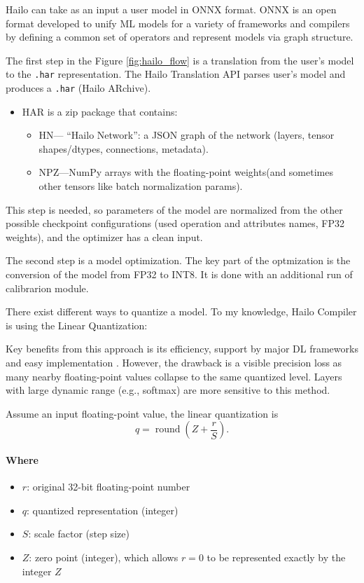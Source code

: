 \documentclass[12pt,a4paper]{report}
\begin{document}
    Hailo can take as an input a user model in ONNX format. ONNX is an open format developed to
    unify ML models for a variety of frameworks and compilers by defining a common set of operators and
    represent models via graph structure.

    The first step in the Figure \ref{fig:hailo_flow} is a translation from the user's
    model to the \texttt{.har} representation. The Hailo Translation API parses user's model
    and produces a \texttt{.har} (Hailo ARchive).

    \begin{itemize}
        \item HAR is a zip package that contains:
        \begin{itemize}
            \item HN— \enquote{Hailo Network}: a JSON graph of the network (layers,
                tensor shapes/dtypes, connections, metadata).
            \item NPZ—NumPy arrays with the floating-point weights(and sometimes
                other tensors like batch normalization params).
        \end{itemize}
    \end{itemize}

    This step is needed, so parameters of the model are normalized from the other
    possible checkpoint configurations (used operation and attributes names, FP32 weights),
    and the optimizer has a clean input.

    The second step is a model optimization. The key part of the optmization is the conversion
    of the model from FP32 to INT8. It is done with an additional run of calibrarion module.

    There exist different ways to quantize a model. To my knowledge, Hailo Compiler is using
    the Linear Quantization:

    Key benefits from this approach is its efficiency, support by major DL frameworks and easy
    implementation \cite{Han_6.5940_2024}. However, the drawback is a visible precision loss as many nearby
    floating-point values collapse to the same quantized level. Layers with large
    dynamic range (e.g., softmax) are more sensitive to this method.

    Assume an input floating-point value, the linear quantization is
    \[
      q = \operatorname{round}\!\left( Z + \frac{r}{S} \right).
    \]
    \paragraph{Where}
    \begin{itemize}
      \item $r$: original 32-bit floating-point number
      \item $q$: quantized representation (integer)
      \item $S$: scale factor (step size)
      \item $Z$: zero point (integer), which allows $r=0$ to be represented exactly by the integer $Z$
    \end{itemize}
\end{document}
